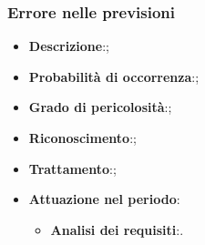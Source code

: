 		\subsubsection{Errore nelle previsioni}
		\begin{itemize} 
			\item \textbf{Descrizione}:;
			\item \textbf{Probabilità di occorrenza}:;
			\item \textbf{Grado di pericolosità}:;
			\item \textbf{Riconoscimento}:;
			\item \textbf{Trattamento}:;
			\item \textbf{Attuazione nel periodo}:
			\begin{itemize}
				\item \textbf{Analisi dei requisiti}:.
			\end{itemize}
		\end{itemize}